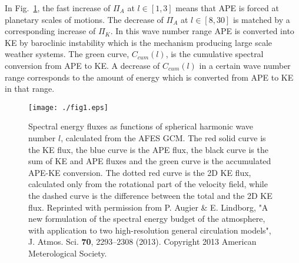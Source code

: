 In Fig.~\ref{Flux}, the fast increase of $ \Pi_A $  at  $ l \in [1, 3] $ means that  APE is forced at planetary scales of motions. The decrease of $ \Pi_A $ at $ l \in [8, 30] $ is matched by a corresponding increase of $ \Pi_K $. In this wave number range APE is converted into KE by baroclinic instability \citep{Vallis:book} which is the mechanism producing large scale weather systems.  The green curve, $ C_{cum}(l) $,  is the cumulative spectral conversion from APE to KE. A decrease of $ C_{cum}(l) $ in a certain wave number range corresponds to the amount of energy which is converted from APE to KE in that range.

\begin{figure}[h]
\centerline{\texttt{[image: ./fig1.eps]}}
 \caption{Spectral energy fluxes as functions of spherical harmonic wave number $ l $, calculated from the AFES GCM. The red solid curve is the KE flux, the blue curve is the APE flux, the black curve is the sum of KE and APE fluxes and the green curve is the accumulated APE-KE conversion. The dotted red curve is the 2D KE flux, calculated only from the rotational part of the velocity field, while the dashed curve is the difference between the total and the 2D KE flux.
Reprinted
with permission from P. Augier \& E. Lindborg,
"A new formulation of the spectral energy budget of the atmosphere, with application to two high-resolution general circulation models",
J. Atmos. Sci. \textbf{70}, 2293--2308 (2013).
Copyright 2013 American Meterological Society.
}
 \label{Flux}
 \end{figure}


